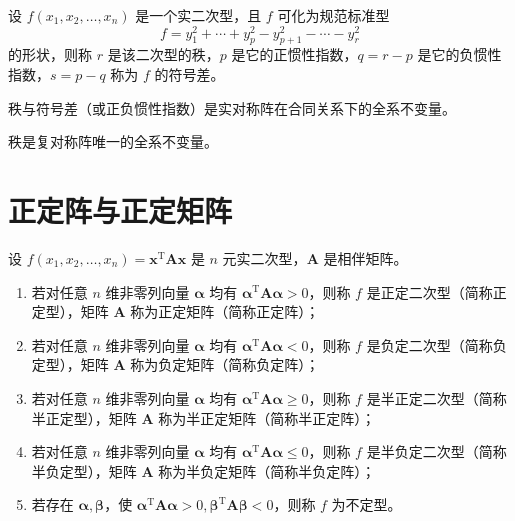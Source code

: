 \begin{definition}
    设 $f(x_1, x_2, \ldots, x_n)$ 是一个实二次型，且 $f$ 可化为规范标准型
    \[
        f = y_{1}^{2} + \cdots + y_{p}^{2} - y_{p + 1}^{2} - \cdots - y_{r}^{2}
    \]
    的形状，则称 $r$ 是该二次型的秩，$p$ 是它的正惯性指数，$q = r - p$ 是它的负惯性指数，$s = p - q$ 称为 $f$ 的符号差。
\end{definition}

\begin{theorem}
    秩与符号差（或正负惯性指数）是实对称阵在合同关系下的全系不变量。
\end{theorem}

\begin{theorem}
    秩是复对称阵唯一的全系不变量。
\end{theorem}


\section{正定阵与正定矩阵}

\begin{definition}
    设 $f(x_1, x_2, \ldots, x_n) = \bm{x}^{\mathrm{T}}\bm{Ax}$ 是 $n$ 元实二次型，$\bm{A}$ 是相伴矩阵。
    \begin{enumerate}
        \item 若对任意 $n$ 维非零列向量 $\bm{\alpha}$ 均有 $\bm{\alpha}^{\mathrm{T}}\bm{A\alpha} > 0$，则称 $f$ 是正定二次型（简称正定型），矩阵 $\bm{A}$ 称为正定矩阵（简称正定阵）；
        \item 若对任意 $n$ 维非零列向量 $\bm{\alpha}$ 均有 $\bm{\alpha}^{\mathrm{T}}\bm{A\alpha} < 0$，则称 $f$ 是负定二次型（简称负定型），矩阵 $\bm{A}$ 称为负定矩阵（简称负定阵）；
        \item 若对任意 $n$ 维非零列向量 $\bm{\alpha}$ 均有 $\bm{\alpha}^{\mathrm{T}}\bm{A\alpha} \geqslant 0$，则称 $f$ 是半正定二次型（简称半正定型），矩阵 $\bm{A}$ 称为半正定矩阵（简称半正定阵）；
        \item 若对任意 $n$ 维非零列向量 $\bm{\alpha}$ 均有 $\bm{\alpha}^{\mathrm{T}}\bm{A\alpha} \leqslant 0$，则称 $f$ 是半负定二次型（简称半负定型），矩阵 $\bm{A}$ 称为半负定矩阵（简称半负定阵）；
        \item 若存在 $\bm{\alpha}, \bm{\beta}$，使 $\bm{\alpha}^{\mathrm{T}}\bm{A\alpha} > 0, \bm{\beta}^{\mathrm{T}}\bm{A\beta} < 0$，则称 $f$ 为不定型。
    \end{enumerate}
\end{definition}

